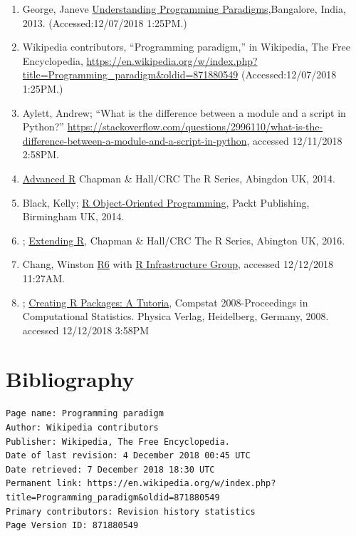 \documentclass[]{book}
\theoremstyle{definition}
\theoremstyle{definition}
\theoremstyle{definition}
\theoremstyle{remark}
\begin{document}
\begin{enumerate}
{  Multivariable Analysis},3\textsuperscript{rd} Ed., Springer, New York
  NY, 2012.
\item
  George, Janeve
  \href{http://www.janeve.me/software-programming/understanding-programming-paradigms}{Understanding
  Programming Paradigms},Bangalore, India, 2013. (Accessed:12/07/2018
  1:25PM.)
\item
  Wikipedia contributors, ``Programming paradigm,'' in Wikipedia, The
  Free Encyclopedia,
  \url{https://en.wikipedia.org/w/index.php?title=Programming_paradigm\&oldid=871880549}
  (Accessed:12/07/2018 1:25PM.)
\item
  Aylett, Andrew; ``What is the difference between a module and a script
  in Python?''
  \url{https://stackoverflow.com/questions/2996110/what-is-the-difference-between-a-module-and-a-script-in-python},
  accessed 12/11/2018 2:58PM.
\item
  \href{https://adv-r.hadley.nz/index.html}{Advanced R} Chapman \&
  Hall/CRC The R Series, Abingdon UK, 2014.
\item
  Black, Kelly;
  \href{https://smile.amazon.com/R-Object-oriented-Programming-Kelly-Black-ebook/dp/B00OYTCJQG/ref=sr_1_1?ie=UTF8\&qid=1544629643\&sr=8-1\&keywords=Packt+R+Object-Oriented}{R
  Object-Oriented Programming}, Packt Publishing, Birmingham UK, 2014.
\item
  ;
  \href{https://smile.amazon.com/Extending-Chapman-Hall-John-Chambers-ebook/dp/B01GRHCLG0/ref=mt_kindle?_encoding=UTF8\&me=\&qid=1544629533}{Extending
  R}, Chapman \& Hall/CRC The R Series, Abington UK, 2016.
\item
  Chang, Winston \href{https://r6.r-lib.org/}{R6} with
  \href{https://github.com/r-lib}{R Infrastructure Group}, accessed
  12/12/2018 11:27AM.
\item
  ;
  \href{https://cran.r-project.org/doc/contrib/Leisch-CreatingPackages.pdf}{Creating
  R Packages: A Tutoria}, Compstat 2008-Proceedings in Computational
  Statistics. Physica Verlag, Heidelberg, Germany, 2008. accessed
  12/12/2018 3:58PM
\end{enumerate}

\chapter{Bibliography}\label{bibliography}

\begin{verbatim}
Page name: Programming paradigm
Author: Wikipedia contributors
Publisher: Wikipedia, The Free Encyclopedia.
Date of last revision: 4 December 2018 00:45 UTC
Date retrieved: 7 December 2018 18:30 UTC
Permanent link: https://en.wikipedia.org/w/index.php?title=Programming_paradigm&oldid=871880549
Primary contributors: Revision history statistics
Page Version ID: 871880549
\end{verbatim}
\end{document}
